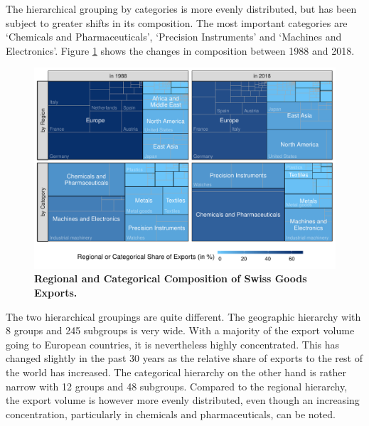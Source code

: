 \documentclass[a4paper,fleqn,11pt]{article}
\begin{document}
The hierarchical grouping by categories is more evenly distributed, but has been subject to greater shifts in its composition. The most important categories are `Chemicals and Pharmaceuticals', `Precision Instruments' and `Machines and Electronics'. Figure \ref{fig:treemap} shows the changes in composition between 1988 and 2018.
\begin{figure}[H]
	\includegraphics[width=\textwidth]{fig/fig_treemap}
	\caption[Regional and Categorical Composition of Swiss Goods Exports]{\small{\textbf{Regional and Categorical Composition of Swiss Goods Exports.}}}\label{fig:treemap}
\end{figure}
The two hierarchical groupings are quite different. The geographic hierarchy with 8 groups and 245 subgroups is very wide. With a majority of the export volume going to European countries, it is nevertheless highly concentrated. This has changed slightly in the past 30 years as the relative share of exports to the rest of the world has increased. The categorical hierarchy on the other hand is rather narrow with 12 groups and 48 subgroups. Compared to the regional hierarchy, the export volume is however more evenly distributed, even though an increasing concentration, particularly in chemicals and pharmaceuticals, can be noted.\\
\end{document}
